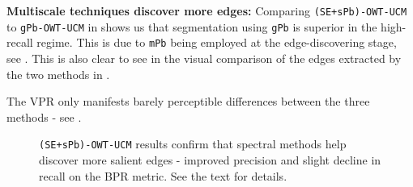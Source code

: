 \textbf{Multiscale techniques %
discover more edges:} Comparing {\tt (SE+sPb)-OWT-UCM} to {\tt gPb-OWT-UCM} in  shows us that segmentation using {\tt gPb} is superior in the high-recall regime. This is due to {\tt mPb} being employed at the edge-discovering stage, see . This is also clear to see in the visual comparison of the edges extracted by the two methods in .

The VPR only manifests barely perceptible differences %
between the three methods 
- see .

\begin{figure}[t]
\centering
\caption[{\tt (SE+sPb)-OWT-UCM} plots]{{\tt (SE+sPb)-OWT-UCM} results confirm that spectral methods help %
discover more salient edges - improved precision and slight decline in recall on the BPR metric. See the text for details.}
\label{fig:SE_nnms_sPb-UCM}
\end{figure}

